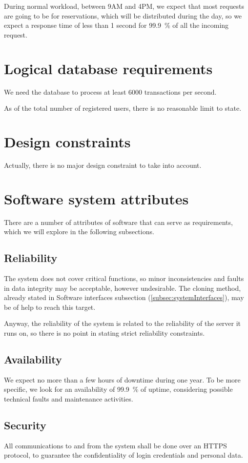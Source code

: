 During normal workload, between 9AM and 4PM, we expect that most requests are going to be for reservations, which will be distributed during the day, so we expect a response time of less than \num{1} second for \SI{99,9}{\percent} of all the incoming request.


\section{Logical database requirements}
We need the database to process at least \num{6000} transactions per second.

As of the total number of registered users, there is no reasonable limit to state.


\section{Design constraints}
Actually, there is no major design constraint to take into account.


\section{Software system attributes}
There are a number of attributes of software that can serve as requirements, which we will explore in the following subsections.

\subsection{Reliability}
The system does not cover critical functions, so minor inconsistencies and faults in data integrity may be acceptable, however undesirable. The cloning method, already stated in Software interfaces subsection (\ref{subsec:systemInterfaces}), may be of help to reach this target. 

Anyway, the reliability of the system is related to the reliability of the server it runs on, so there is no point in stating strict reliability constraints.


\subsection{Availability}
We expect no more than a few hours of downtime during one year. To be more specific, we look for an availability of \SI{99,9}{\percent} of uptime, considering possible technical faults and maintenance activities. 


\subsection{Security}
All communications to and from the system shall be done over an HTTPS protocol, to guarantee the confidentiality of login credentials and personal data.


